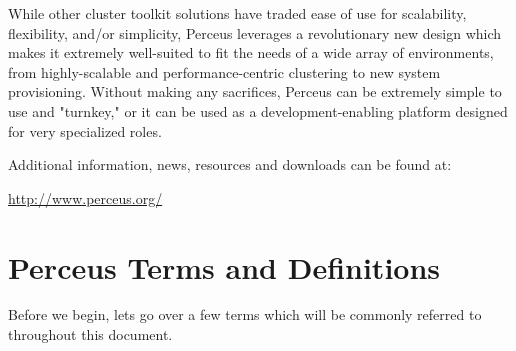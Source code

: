 \documentclass[10pt,letterpaper]{report}
\begin{document}
While other cluster toolkit solutions have traded ease of use for scalability,
flexibility, and/or simplicity, Perceus leverages a revolutionary new design
which makes it extremely well-suited to fit the needs of a wide array of
environments, from highly-scalable and performance-centric clustering to new
system provisioning. Without making any sacrifices, Perceus can be extremely
simple to use and "turnkey," or it can be used as a development-enabling
platform designed for very specialized roles.

\noindent Additional information, news, resources and downloads can be found
at:

{\ttfamily
\indent \url{http://www.perceus.org/}
}

\section{Perceus Terms and Definitions}
Before we begin, lets go over a few terms which will be commonly referred to
throughout this document.
\end{document}
